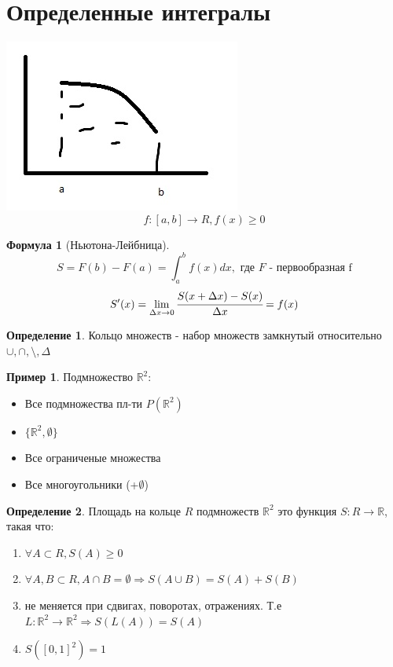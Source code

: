 \documentclass[a4paper]{article}
\theoremstyle{definition}
\newtheorem*{definition*}{Определение}
\newtheorem*{exmp}{Пример}
\newtheorem*{formula}{Формула}
\numberwithin{theorem}{subsection}
\numberwithin{lemma}{subsection}
\numberwithin{definition}{subsection}
\numberwithin{comment*}{subsection}
\numberwithin{consequence}{subsection}
\numberwithin{property}{subsection}
\begin{document}
\section{Определенные интегралы}
\includegraphics{opr_int}
$$ f:[a,b] \rightarrow R, f(x) \geq 0$$
\begin{formula}[Ньютона-Лейбница]
 $$S = F(b)-F(a) =  \int_a^b f(x) dx, \text{ где } F \text{ - первообразная f}$$
 $$S'(x) = \lim_{\Delta x \rightarrow 0}{\cfrac{S(x +\Delta x)-S(x)}{\Delta x}} = f(x) $$
\end{formula}
\begin{definition*}
 Кольцо множеств - набор множеств замкнутый относительно
 $\cup, \cap, \setminus , \Delta  $
\end{definition*}
\begin{exmp}
 Подмножество $\mathbb{R}^2: $
 \begin{itemize}
  \item Все подмножества пл-ти $P(\mathbb{R}^2)$
  \item $\{\mathbb{R}^2, \emptyset\}$
  \item Все ограниченые множества
  \item Все многоугольники (+$\emptyset$)
 \end{itemize}
\end{exmp}
\begin{definition*}
 Площадь на кольце $R$ подмножеств $\mathbb{R}^2$ это функция $S: R \rightarrow \mathbb{R}$, такая что:
 \begin{enumerate}
  \item $\forall{A} \subset R, S(A) \geq 0$
  \item $ \forall{A,B} \subset R, A\cap B = \emptyset \Rightarrow S(A\cup B) = S(A) + S(B)$
  \item не меняется при сдвигах, поворотах, отражениях. Т.е $L:\mathbb{R}^2 \rightarrow \mathbb{R}^2 \Rightarrow S(L(A)) = S(A)$
  \item $S([0,1]^2) = 1$
 \end{enumerate}
\end{definition*}
\end{document}

